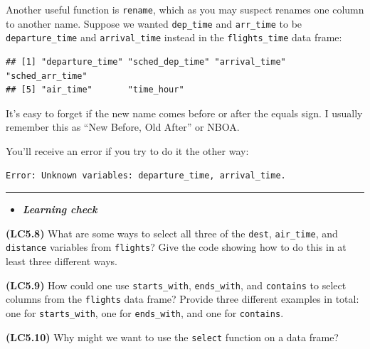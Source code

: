 \documentclass[]{tufte-book}
\newenvironment{Shaded}{\begin{snugshade}}{\end{snugshade}}
\newcommand{\KeywordTok}[1]{\textcolor[rgb]{0.13,0.29,0.53}{\textbf{{#1}}}}
\newcommand{\DataTypeTok}[1]{\textcolor[rgb]{0.13,0.29,0.53}{{#1}}}
\newcommand{\StringTok}[1]{\textcolor[rgb]{0.31,0.60,0.02}{{#1}}}
\newcommand{\NormalTok}[1]{{#1}}
\let\oldrule=\rule
\renewcommand{\rule}[1]{\oldrule{\linewidth}}
\newenvironment{rmdblock}[1]
  {\begin{shaded*}
  \begin{itemize}
  \renewcommand{\labelitemi}{
    \raisebox{-.7\height}[0pt][0pt]{
    }
  }
  \item
  }
  {
  \end{itemize}
  \end{shaded*}
  }
\newenvironment{learncheck}
  {\begin{rmdblock}{warning}}
  {\end{rmdblock}}
\begin{document}
Another useful function is \texttt{rename}, which as you may suspect
renames one column to another name. Suppose we wanted \texttt{dep\_time}
and \texttt{arr\_time} to be \texttt{departure\_time} and
\texttt{arrival\_time} instead in the \texttt{flights\_time} data frame:

\begin{Shaded}
\end{Shaded}

\begin{verbatim}
## [1] "departure_time" "sched_dep_time" "arrival_time"   "sched_arr_time"
## [5] "air_time"       "time_hour"
\end{verbatim}

It's easy to forget if the new name comes before or after the equals
sign. I usually remember this as ``New Before, Old After'' or NBOA.

You'll receive an error if you try to do it the other way:

\begin{verbatim}
Error: Unknown variables: departure_time, arrival_time.
\end{verbatim}

\begin{center}\rule{0.5\linewidth}{\linethickness}\end{center}

\begin{learncheck}
\textbf{\emph{Learning check}}
\end{learncheck}

\textbf{(LC5.8)} What are some ways to select all three of the
\texttt{dest}, \texttt{air\_time}, and \texttt{distance} variables from
\texttt{flights}? Give the code showing how to do this in at least three
different ways.

\textbf{(LC5.9)} How could one use \texttt{starts\_with},
\texttt{ends\_with}, and \texttt{contains} to select columns from the
\texttt{flights} data frame? Provide three different examples in total:
one for \texttt{starts\_with}, one for \texttt{ends\_with}, and one for
\texttt{contains}.

\textbf{(LC5.10)} Why might we want to use the \texttt{select} function
on a data frame?
\end{document}
